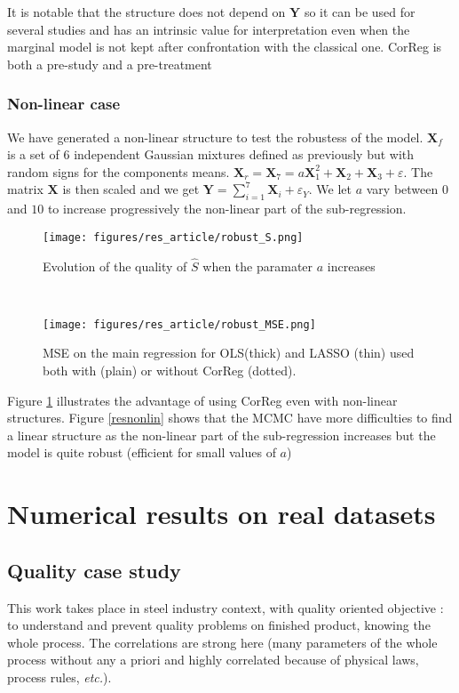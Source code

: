 \documentclass[11pt,a4paper]{article}
\begin{document}
It is notable that the structure does not depend on $\boldsymbol{Y}$ so it can be used for several studies and has an intrinsic value for interpretation even when the marginal model is not kept after confrontation with the classical one. CorReg is both a pre-study and a pre-treatment

\FloatBarrier
\subsubsection{Non-linear case}

We have generated a non-linear structure to test the robustess of the model. $\boldsymbol{X}_f$ is a set of 6 independent Gaussian mixtures defined as previously but with random signs for the components means. $\boldsymbol{X}_r=\boldsymbol{X}_7=a\boldsymbol{X}_1^2+\boldsymbol{X}_2+\boldsymbol{X}_3+ \varepsilon$. The matrix $\boldsymbol{X}$ is then scaled and we get $\boldsymbol{Y}=\sum_{i=1}^7\boldsymbol{X}_i+\varepsilon_Y$. We let $a$ vary between $0$ and $10$ to increase progressively the non-linear part of the sub-regression.

 \begin{figure}[h!] 
	\begin{minipage}[l]{.48\linewidth}
			\texttt{[image: figures/res\_article/robust\_S.png]} 
			\caption{Evolution of the quality of $\hat{S}$ when the paramater $a$ increases}\label{resnonlin}
	\end{minipage} \
   \begin{minipage}[r]{.48\linewidth}
			\texttt{[image: figures/res\_article/robust\_MSE.png]} 
			\caption{MSE on the main regression for OLS(thick) and LASSO (thin) used both with (plain) or without CorReg (dotted).}\label{MSEnonlin}
   \end{minipage}
\end{figure}
Figure \ref{MSEnonlin} illustrates the advantage of using CorReg even with non-linear structures. Figure \ref{resnonlin} shows that the MCMC have more difficulties to find a linear structure as the non-linear part of the sub-regression increases but the model is quite robust (efficient for small values of $a$)

	\FloatBarrier	
\section{Numerical results on real datasets} \label{sectionrealcase}
\subsection{Quality case study} \label{sectionexfos}
This work takes place in steel industry context, with quality oriented objective : to understand and prevent quality problems on finished product, knowing the whole process. The correlations are strong here (many parameters of the whole process without any a priori and highly correlated because of physical laws, process rules, {\it etc.}). 
		
\end{document}
